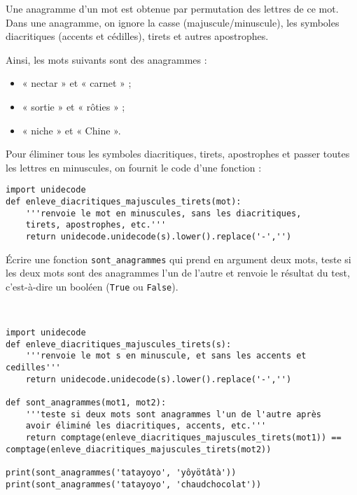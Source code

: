 Une anagramme d'un mot est obtenue par permutation des lettres de ce mot. Dans une anagramme, on ignore la casse (majuscule/minuscule), les symboles diacritiques (accents et cédilles), tirets et autres apostrophes.

Ainsi, les mots suivants sont des anagrammes :
\begin{itemize}
\item « nectar » et « carnet » ;
\item « sortie » et « rôties » ;
\item « niche » et « Chine ».
\end{itemize}

\begin{exercice}
Pour éliminer tous les symboles diacritiques, tirets, apostrophes et passer toutes les lettres en minuscules, on fournit le code d'une fonction :
\begin{verbatim}
import unidecode
def enleve_diacritiques_majuscules_tirets(mot):
    '''renvoie le mot en minuscules, sans les diacritiques,
    tirets, apostrophes, etc.'''
    return unidecode.unidecode(s).lower().replace('-','')
\end{verbatim}
\end{exercice}

Écrire une fonction \verb?sont_anagrammes? qui prend en argument deux mots, teste si les deux mots sont des anagrammes l'un de l'autre et renvoie le résultat du test, c'est-à-dire un booléen (\texttt{True} ou \texttt{False}).

\begin{solution}~\
\begin{verbatim}
import unidecode
def enleve_diacritiques_majuscules_tirets(s):
    '''renvoie le mot s en minuscule, et sans les accents et cedilles'''
    return unidecode.unidecode(s).lower().replace('-','')

def sont_anagrammes(mot1, mot2):
    '''teste si deux mots sont anagrammes l'un de l'autre après
    avoir éliminé les diacritiques, accents, etc.'''
    return comptage(enleve_diacritiques_majuscules_tirets(mot1)) == comptage(enleve_diacritiques_majuscules_tirets(mot2))

print(sont_anagrammes('tatayoyo', 'yôyötâtà'))
print(sont_anagrammes('tatayoyo', 'chaudchocolat'))
\end{verbatim}
\end{solution}

